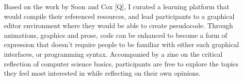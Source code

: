Based on the work by Soon and Cox [Q], I curated a learning platform that would compile their referenced resources, and lead participants to a graphical editor environment where they would be able to create pseudocode. Through animations, graphics and prose, code can be enhanced to become a form of expression that doesn't require people to be familiar with either such graphical interfaces, or programming syntax. Accompanied by a zine on the critical reflection of computer science basics, participants are free to explore the topics they feel most interested in while reflecting on their own opinions. 